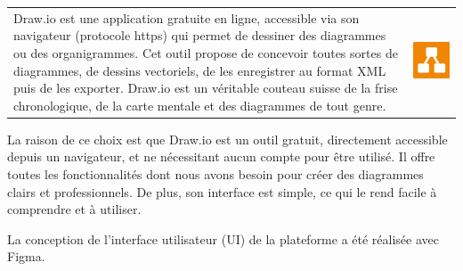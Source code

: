 \documentclass{article}
\begin{document}
\noindent
\begin{tabular}
{@{}m{}@{\hspace{1em}}m{}@{}}
Draw.io est une application gratuite en ligne, accessible via son navigateur (protocole https) qui permet de dessiner des diagrammes ou des organigrammes.  
Cet outil propose de concevoir toutes sortes de diagrammes, de dessins vectoriels, de les enregistrer au format XML puis de les exporter.  
Draw.io est un véritable couteau suisse de la frise chronologique, de la carte mentale et des diagrammes de tout genre.\cite{draw-io}
&
\includegraphics[width=\linewidth]{drawio (2).png} %
\end{tabular}

\noindent La raison de ce choix est que Draw.io est un outil gratuit, directement accessible depuis un navigateur, et ne nécessitant aucun compte pour être utilisé. Il offre toutes les fonctionnalités dont nous avons besoin pour créer des diagrammes clairs et professionnels. De plus, son interface est simple, ce qui le rend facile à comprendre et à utiliser.




\vspace{1cm}

\noindent La conception de l’interface utilisateur (UI) de la plateforme a été réalisée avec Figma.
\end{document}
